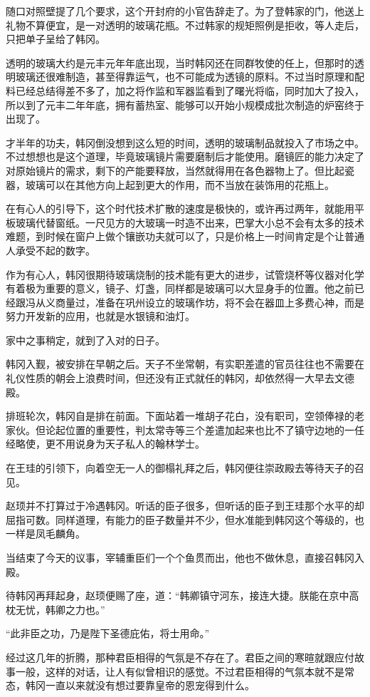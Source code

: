 随口对照壁提了几个要求，这个开封府的小官告辞走了。为了登韩家的门，他送上礼物不算便宜，是一对透明的玻璃花瓶。不过韩家的规矩照例是拒收，等人走后，只把单子呈给了韩冈。

透明的玻璃大约是元丰元年年底出现，当时韩冈还在同群牧使的任上，但那时的透明玻璃还很难制造，甚至得靠运气，也不可能成为透镜的原料。不过当时原理和配料已经总结得差不多了，加之将作监和军器监看到了曙光将临，同时加大了投入，所以到了元丰二年年底，拥有蓄热室、能够可以开始小规模成批次制造的炉窑终于出现了。

才半年的功夫，韩冈倒没想到这么短的时间，透明的玻璃制品就投入了市场之中。不过想想也是这个道理，毕竟玻璃镜片需要磨制后才能使用。磨镜匠的能力决定了对原始镜片的需求，剩下的产能要释放，当然就得用在各色器物上了。但比起瓷器，玻璃可以在其他方向上起到更大的作用，而不当放在装饰用的花瓶上。

在有心人的引导下，这个时代技术扩散的速度是极快的，或许再过两年，就能用平板玻璃代替窗纸。一尺见方的大玻璃一时造不出来，巴掌大小总不会有太多的技术难题，到时候在窗户上做个镶嵌功夫就可以了，只是价格上一时间肯定是个让普通人承受不起的数字。

作为有心人，韩冈很期待玻璃烧制的技术能有更大的进步，试管烧杯等仪器对化学有着极为重要的意义，镜子、灯盏，同样都是玻璃可以大显身手的位置。他之前已经跟冯从义商量过，准备在巩州设立的玻璃作坊，将不会在器皿上多费心神，而是努力开发新的应用，也就是水银镜和油灯。

家中之事稍定，就到了入对的日子。

韩冈入觐，被安排在早朝之后。天子不坐常朝，有实职差遣的官员往往也不需要在礼仪性质的朝会上浪费时间，但还没有正式就任的韩冈，却依然得一大早去文德殿。

排班轮次，韩冈自是排在前面。下面站着一堆胡子花白，没有职司，空领俸禄的老家伙。但论起位置的重要性，判太常寺等三个差遣加起来也比不了镇守边地的一任经略使，更不用说身为天子私人的翰林学士。

在王珪的引领下，向着空无一人的御榻礼拜之后，韩冈便往崇政殿去等待天子的召见。

赵顼并不打算过于冷遇韩冈。听话的臣子很多，但听话的臣子到王珪那个水平的却屈指可数。同样道理，有能力的臣子数量并不少，但水准能到韩冈这个等级的，也一样是凤毛麟角。

当结束了今天的议事，宰辅重臣们一个个鱼贯而出，他也不做休息，直接召韩冈入殿。

待韩冈再拜起身，赵顼便赐了座，道：“韩卿镇守河东，接连大捷。朕能在京中高枕无忧，韩卿之力也。”

“此非臣之功，乃是陛下圣德庇佑，将士用命。”

经过这几年的折腾，那种君臣相得的气氛是不存在了。君臣之间的寒暄就跟应付故事一般，这样的对话，让人有似曾相识的感觉。不过君臣相得的气氛本就不是常态，韩冈一直以来就没有想过要靠皇帝的恩宠得到什么。

